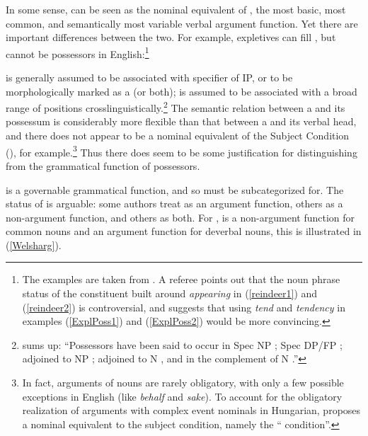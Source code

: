 \documentclass[output=paper,hidelinks]{langscibook}
\begin{document}
In some sense, {\POSS} can be seen as the nominal equivalent of {\SUBJ}, the most basic, most common, and semantically most variable verbal argument function. Yet there are important differences between the two. For example, expletives can fill {\SUBJ}, but cannot be possessors in English:\footnote{The examples are taken from  \citet[315]{BresnanEtAl2016}. A referee points out that the noun phrase status of the constituent built around \emph{appearing} in (\ref{reindeer1}) and (\ref{reindeer2}) is controversial, and suggests that using \emph{tend} and \emph{tendency} in examples (\ref{ExplPoss1}) and (\ref{ExplPoss2}) would be more convincing.}

\eal\label{ExplPoss1}
\label{reindeer1}
\zl

\eal\label{ExplPoss2}
\label{reindeer2}
\zl

 {\SUBJ} is generally assumed to be associated with specifier of IP, or to be morphologically marked as a {\SUBJ} (or both);  {\POSS} is assumed to be associated with a broad range of positions crosslinguistically.\footnote{\citet[209]{Charters14} sums up: ``Possessors have been said to occur in Spec NP \citep{Sadler00, Charters04, Laczko07, Lodrup11pp}; Spec DP/FP \citep{Charters04, Strunk05}; adjoined to NP \citep{ChisaPayn01}; adjoined to N \citep{Lodrup11pp}, and in the complement of N \citep{ChisaPayn01}.''} The semantic relation between a {\POSS} and its possessum is considerably more flexible than that between a {\SUBJ} and its verbal head, and there does not appear to be a nominal equivalent of the Subject Condition (), for example.\footnote{In fact, arguments of nouns are rarely obligatory, with only a few possible exceptions in English (like \emph{behalf} and \emph{sake}). To account for the obligatory realization of arguments with complex event nominals in Hungarian, \citet{Laczko95} proposes a nominal equivalent to the subject condition, namely the ``{\POSS} condition''.}  Thus there does seem to be some justification for distinguishing {\SUBJ} from the grammatical function of possessors.


{\SUBJ} is a governable grammatical function, and so must be subcategorized for. The status of {\POSS} is arguable: some authors treat {\POSS} as an argument function, others as a non-argument function, and others as both. For \citet[97]{Sadler00}, {\POSS} is a non-argument function for common nouns and an argument function for deverbal nouns, this is illustrated in (\ref{Welsharg}). 
\end{document}
